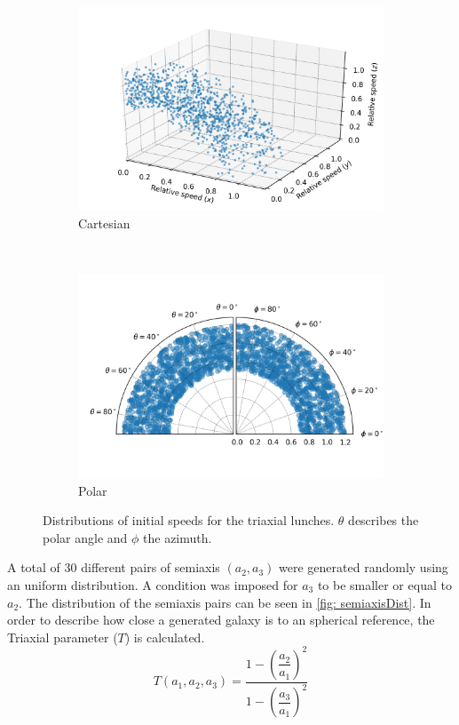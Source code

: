 	\begin{figure}[h]
		\centering
		\begin{subfigure}[b]{0.49\textwidth}
			\includegraphics[width = \textwidth]{"../Files/Week 13/3d_initial_speeds"}
			\caption{Cartesian}
		\end{subfigure}
		~ 
		\begin{subfigure}[b]{0.49\textwidth}
			\includegraphics[width=\textwidth]{"../Files/Week 13/polar_initial_speeds"}
			\caption{Polar}
		\end{subfigure}
		\caption{Distributions of initial speeds for the triaxial lunches. $\theta$ describes the polar angle and $\phi$ the azimuth.}
		\label{fig: initialSpeedDistributions}
	\end{figure}

	A total of 30 different pairs of semiaxis $(a_2, a_3)$ were generated randomly using an uniform distribution. A condition was imposed for $a_3$ to be smaller or equal to $a_2$. The distribution of the semiaxis pairs can be seen in \autoref{fig: semiaxisDist}. In order to describe how close a generated galaxy is to an spherical reference, the Triaxial parameter ($T$) is calculated.
	\begin{equation}\label{eq: triaxialParameter}
		T(a_1, a_2, a_3) = \dfrac{1 - \left(\dfrac{a_2}{a_1}\right)^2}{1 - \left(\dfrac{a_3}{a_1}\right)^2}
	\end{equation}
	
